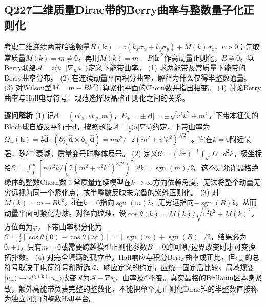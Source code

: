 \subsection*{Q227\quad 二维质量Dirac带的Berry曲率与整数量子化正则化}
考虑二维连续两带哈密顿量$H(\boldsymbol k)=v(k_x\sigma_x+k_y\sigma_y)+M(k)\sigma_z$，$v>0$；先取常质量$M(k)=m\ne0$，再用$M(k)=m-B|\boldsymbol k|^2$作高动量正则化，$B\ne0$。以Berry联络$\mathcal A=i\langle u_-|\nabla_{\boldsymbol k}u_-\rangle$定义下能带曲率。
(1) 求两能带及常质量下能带的Berry曲率分布。
(2) 在连续动量平面积分曲率，解释为什么仅得半整数通量。
(3) 对Wilson型$M=m-Bk^2$计算紧化平面的Chern数并指出相变。
(4) 讨论Berry曲率与Hall电导符号、规范选择及晶格正则化之间的关系。
\par\textbf{逐问解析}
(1) 记$\boldsymbol d=(vk_x,vk_y,m)$，$E_\pm=\pm|\boldsymbol d|=\pm\sqrt{v^2k^2+m^2}$。下带本征矢的Bloch球自旋反平行于$\boldsymbol d$，按照题设$\mathcal A=i\langle u|\nabla u\rangle$约定，下带曲率为$\Omega_-(\boldsymbol k)=\tfrac12\hat{\boldsymbol d}\cdot(\partial_{k_x}\hat{\boldsymbol d}\times\partial_{k_y}\hat{\boldsymbol d})=mv^2/[2(m^2+v^2k^2)^{3/2}]$。它在$k=0$附近最强，随$k^{-3}$衰减，质量变号时整体反号。
(2) 定义$\mathcal C=(2\pi)^{-1}\int_{\mathbb R^2}\Omega_-\,d^2k$。极坐标给$\mathcal C=\int_0^\infty [mv^2k/(2(m^2+v^2k^2)^{3/2})]\,dk=\operatorname{sgn}(m)/2$。这不是允许晶格绝缘体的整数Chern数：常质量连续模型在$k\to\infty$方向依赖角度，无法将整个动量无穷远视为同一个紧化点，故半整数反映未完备的紫外正则化。
(3) 对$M(k)=m-Bk^2$，$\hat{\boldsymbol d}$在$k=0$指向$\operatorname{sgn}(m)\hat z$，无穷远指向$-\operatorname{sgn}(B)\hat z$，从而动量平面可紧化为球。对径向纹理，设$\cos\theta(k)=M(k)/\sqrt{v^2k^2+M(k)^2}$，方位角为$\varphi$，下带曲率积分化为$\mathcal C=\frac12[\cos\theta(0)-\cos\theta(\infty)]=[\operatorname{sgn}(m)+\operatorname{sgn}(B)]/2$，结果必为$0,\pm1$。只有$m=0$或需要跨越模型正则化参数$B=0$的间隙/边界改变时才可变换拓扑数。
(4) 对完全填满的孤立带，Hall响应与积分Berry曲率成正比，但$\sigma_{xy}$的总符号取决于电荷符号和所选$\mathcal A$、响应定义的约定，应统一固定后比较。局域规变$|u_-\rangle\to e^{i\chi(\boldsymbol k)}|u_-\rangle$改变$\mathcal A$为$\mathcal A-\nabla\chi$，曲率及$\mathcal C$不变。真实晶格的Brillouin区本身紧致，额外高能带负责完整的整数化，不能把单个无正则化Dirac锥的半整数直接称为独立可测的整数Hall平台。
\par\medskip
